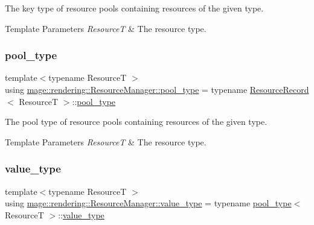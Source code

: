 The key type of resource pools containing resources of the given type.


\begin{DoxyTemplParams}{Template Parameters}
{\em ResourceT} & The resource type. \\
\hline
\end{DoxyTemplParams}
\mbox{\label{classmage_1_1rendering_1_1_resource_manager_ab21a4e280087032ee533f267bd9bf602}} 
\subsubsection{\texorpdfstring{pool\+\_\+type}{pool\_type}}
{\footnotesize\ttfamily template$<$typename ResourceT $>$ \\
using \mbox{\hyperlink{classmage_1_1rendering_1_1_resource_manager_ab21a4e280087032ee533f267bd9bf602}{mage\+::rendering\+::\+Resource\+Manager\+::pool\+\_\+type}} =  typename \mbox{\hyperlink{structmage_1_1rendering_1_1_resource_manager_1_1_resource_record}{Resource\+Record}}$<$ ResourceT $>$\+::\mbox{\hyperlink{classmage_1_1rendering_1_1_resource_manager_ab21a4e280087032ee533f267bd9bf602}{pool\+\_\+type}}}

The pool type of resource pools containing resources of the given type.


\begin{DoxyTemplParams}{Template Parameters}
{\em ResourceT} & The resource type. \\
\hline
\end{DoxyTemplParams}
\mbox{\label{classmage_1_1rendering_1_1_resource_manager_abb6ad8fd8054364a230839110c42174f}} 
\subsubsection{\texorpdfstring{value\+\_\+type}{value\_type}}
{\footnotesize\ttfamily template$<$typename ResourceT $>$ \\
using \mbox{\hyperlink{classmage_1_1rendering_1_1_resource_manager_abb6ad8fd8054364a230839110c42174f}{mage\+::rendering\+::\+Resource\+Manager\+::value\+\_\+type}} =  typename \mbox{\hyperlink{classmage_1_1rendering_1_1_resource_manager_ab21a4e280087032ee533f267bd9bf602}{pool\+\_\+type}}$<$ ResourceT $>$\+::\mbox{\hyperlink{classmage_1_1rendering_1_1_resource_manager_abb6ad8fd8054364a230839110c42174f}{value\+\_\+type}}}

